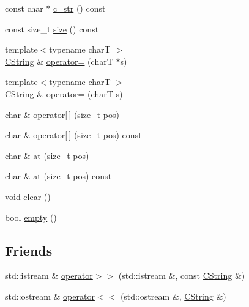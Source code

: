 \begin{DoxyCompactItemize}
\item 
const char $\ast$ \hyperlink{class_tri_1_1_util_1_1_c_string_ab238bf2af6c5785ff323bbcf93d302a0}{c\+\_\+str} () const 
\item 
const size\+\_\+t \hyperlink{class_tri_1_1_util_1_1_c_string_a4c17452a40793f4e34f7fe6fc11afed3}{size} () const 
\item 
{\footnotesize template$<$typename char\+T $>$ }\\\hyperlink{class_tri_1_1_util_1_1_c_string}{C\+String} \& \hyperlink{class_tri_1_1_util_1_1_c_string_a994bb7db103b59cb9f691f4cb30a171b}{operator=} (char\+T $\ast$s)
\item 
{\footnotesize template$<$typename char\+T $>$ }\\\hyperlink{class_tri_1_1_util_1_1_c_string}{C\+String} \& \hyperlink{class_tri_1_1_util_1_1_c_string_af54905267cd2450692109da5eb71b437}{operator=} (char\+T s)
\item 
char \& \hyperlink{class_tri_1_1_util_1_1_c_string_a027b1a9a9b1733baf231554985ac23ce}{operator\mbox{[}$\,$\mbox{]}} (size\+\_\+t pos)
\item 
char \& \hyperlink{class_tri_1_1_util_1_1_c_string_ab00132865b850c0f0e78f54710fb026a}{operator\mbox{[}$\,$\mbox{]}} (size\+\_\+t pos) const 
\item 
char \& \hyperlink{class_tri_1_1_util_1_1_c_string_aa34685eec2add90d7c52edbf10173829}{at} (size\+\_\+t pos)
\item 
char \& \hyperlink{class_tri_1_1_util_1_1_c_string_a88ae6396534730c4da9ad4ed6194977f}{at} (size\+\_\+t pos) const 
\item 
void \hyperlink{class_tri_1_1_util_1_1_c_string_a1f5bdcec52b490c05f18532a060758a9}{clear} ()
\item 
bool \hyperlink{class_tri_1_1_util_1_1_c_string_a8b37fd7899a78bda4af51de11440738f}{empty} ()
\end{DoxyCompactItemize}
\subsection*{Friends}
\begin{DoxyCompactItemize}
\item 
std\+::istream \& \hyperlink{class_tri_1_1_util_1_1_c_string_adc6c111687a6434f23a012c206d9ba38}{operator$>$$>$} (std\+::istream \&, const \hyperlink{class_tri_1_1_util_1_1_c_string}{C\+String} \&)
\item 
std\+::ostream \& \hyperlink{class_tri_1_1_util_1_1_c_string_adecb1f467107a740ab54745cca77b09f}{operator$<$$<$} (std\+::ostream \&, \hyperlink{class_tri_1_1_util_1_1_c_string}{C\+String} \&)
\end{DoxyCompactItemize}


